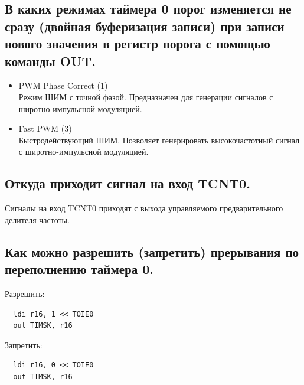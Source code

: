 \subsection{В каких режимах таймера 0 порог изменяется не сразу (двойная буферизация записи) при записи нового значения в регистр порога с помощью команды OUT. }
\begin{itemize}
  \item PWM Phase Correct (1)\\
Режим ШИМ с точной фазой. Предназначен для генерации сигналов с
широтно-импульсной модуляцией.
  \item Fast PWM (3) \\
Быстродействующий ШИМ. Позволяет генерировать высокочастотный сигнал
с широтно-импульсной модуляцией.
\end{itemize}

\subsection{Откуда приходит сигнал на вход TCNT0.}
Сигналы на вход TCNT0 приходят с выхода управляемого предварительного 
делителя частоты.


\subsection{Как можно разрешить (запретить) прерывания по переполнению таймера 0.}
Разрешить:
\begin{verbatim}
  ldi r16, 1 << TOIE0
  out TIMSK, r16
\end{verbatim}

Запретить:
\begin{verbatim}
  ldi r16, 0 << TOIE0
  out TIMSK, r16
\end{verbatim}


